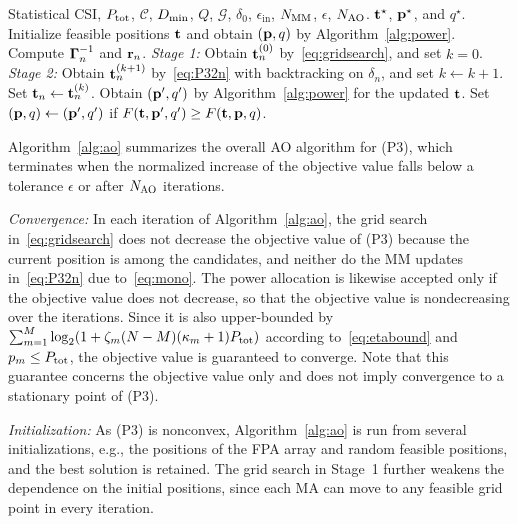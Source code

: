 \documentclass[journal]{IEEEtran}
\begin{document}
\begin{algorithm}[t]
\caption{AO Algorithm for (P3)}\label{alg:ao}
\small\begin{algorithmic}[1]
\Require Statistical CSI, $P_{\mathrm{tot}}$, $\mathcal C$, $D_{\min}$, $Q$, $\mathcal G$, $\delta_0$, $\epsilon_{\mathrm{in}}$, $N_{\mathrm{MM}}$, $\epsilon$, $N_{\mathrm{AO}}$.
\Ensure $\mathbf{t}^\star$, $\mathbf{p}^\star$, and $q^\star$.
\State Initialize feasible positions $\mathbf{t}$ and obtain $(\mathbf{p},q)$ by Algorithm~\ref{alg:power}.
\Repeat
    \State Compute $\boldsymbol{\Gamma}_n^{-1}$ and $\mathbf{r}_n$.
    \State \textit{Stage 1:} Obtain $\mathbf{t}_n^{(0)}$ by~\eqref{eq:gridsearch}, and set $k=0$.
    \Repeat
      \State \textit{Stage 2:} Obtain $\mathbf{t}_n^{(k+1)}$ by~\eqref{eq:P32n} with backtracking on $\delta_n$, and set $k\leftarrow k+1$.
    \State Set $\mathbf{t}_n\leftarrow\mathbf{t}_n^{(k)}$.
  \EndFor
  \State Obtain $(\mathbf{p}',q')$ by Algorithm~\ref{alg:power} for the updated $\mathbf{t}$.
  \State Set $(\mathbf{p},q)\leftarrow(\mathbf{p}',q')$ if $F(\mathbf{t},\mathbf{p}',q')\ge F(\mathbf{t},\mathbf{p},q)$.
\end{algorithmic}
\end{algorithm}

Algorithm~\ref{alg:ao} summarizes the overall AO algorithm for (P3), which terminates when the normalized increase of the objective value falls below a tolerance $\epsilon$ or after $N_{\mathrm{AO}}$ iterations.

\textit{Convergence:} In each iteration of Algorithm~\ref{alg:ao}, the grid search in~\eqref{eq:gridsearch} does not decrease the objective value of (P3) because the current position is among the candidates, and neither do the MM updates in~\eqref{eq:P32n} due to~\eqref{eq:mono}. The power allocation is likewise accepted only if the objective value does not decrease, so that the objective value is nondecreasing over the iterations. Since it is also upper-bounded by $\sum_{m=1}^M\log_2(1+\zeta_m(N-M)(\kappa_m+1)P_{\mathrm{tot}})$ according to~\eqref{eq:etabound} and $p_m\le P_{\mathrm{tot}}$, the objective value is guaranteed to converge. Note that this guarantee concerns the objective value only and does not imply convergence to a stationary point of (P3).

\textit{Initialization:} As (P3) is nonconvex, Algorithm~\ref{alg:ao} is run from several initializations, e.g., the positions of the FPA array and random feasible positions, and the best solution is retained. The grid search in Stage~1 further weakens the dependence on the initial positions, since each MA can move to any feasible grid point in every iteration.
\end{document}
